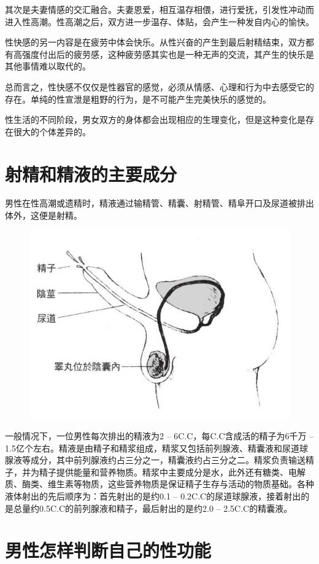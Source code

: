 \documentclass[12pt,UTF8]{ctexbook}
\begin{document}
其次是夫妻情感的交汇融合。夫妻恩爱，相互温存相偎，进行爱抚，引发性冲动而进入性高潮。性高潮之后，双方进一步温存、体贴，会产生一种发自内心的愉快。

性快感的另一内容是在疲劳中体会快乐。从性兴奋的产生到最后射精结束，双方都有高强度付出后的疲劳感，这种疲劳感其实也是一种无声的交流，其产生的快乐是其他事情难以取代的。

总而言之，性快感不仅仅是性器官的感觉，必须从情感、心理和行为中去感受它的存在。单纯的性宣泄是粗野的行为，是不可能产生完美快乐的感觉的。

性生活的不同阶段，男女双方的身体都会出现相应的生理变化，但是这种变化是存在很大的个体差异的。

\section{射精和精液的主要成分}

男性在性高潮或遗精时，精液通过输精管、精囊、射精管、精阜开口及尿道被排出体外，这便是射精。

\begin{figure}[htbp]
	\centering
	\includegraphics[width=0.7\linewidth]{5}
	\caption{}
\end{figure}

一般情况下，一位男性每次排出的精液为2 -- 6C.C，每C.C含成活的精子为6千万 -- 1.5亿个左右。精液是由精子和精浆组成，精浆又包括前列腺液、精囊液和尿道球腺液等成分，其中前列腺液约占三分之一，精囊液约占三分之二。精浆负责输送精子，并为精子提供能量和营养物质。精浆中主要成分是水，此外还有糖类、电解质、酶类、维生素等物质，这些营养物质是保证精子生存与活动的物质基础。各种液体射出的先后顺序为：首先射出的是约0.1 -- 0.2C.C的尿道球腺液，接着射出的是总量约0.5C.C的前列腺液和精子，最后射出的是约2.0 -- 2.5C.C的精囊液。

\section{男性怎样判断自己的性功能}
\end{document}
